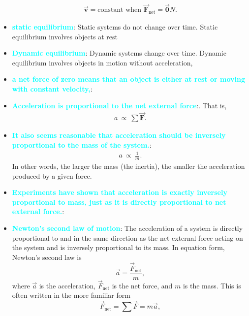 \documentclass{report}
\begin{document}
\begin{itemize}
                \begin{align*}
                    \vec{\mathbf{v}} = \text{constant when } \vec{\mathbf{F}}_{\text{net}} = \vec{\mathbf{0}}N
                .\end{align*}
            \item \textbf{\textcolor{cyan}{static equilibrium}}: Static systems do not change over time. Static equilibrium involves objects at rest
            \item \textbf{\textcolor{cyan}{Dynamic equilibrium}}: Dynamic systems change over time. Dynamic equilibrium involves objects in motion without acceleration,
            \item \textbf{\textcolor{cyan}{a net force of zero means that an object is either at rest or moving with constant velocity,}}:
            \item \textbf{\textcolor{cyan}{Acceleration is proportional to the net external force}}:. That is,
                \begin{align*}
                    a\ \propto\ \sum \vec{\mathbf{F}}
                .\end{align*}
            \item \textbf{\textcolor{cyan}{It also seems reasonable that acceleration should be inversely proportional to the mass of the system.}}:
                \begin{align*}
                    a\ \propto\ \frac{1}{m}
                .\end{align*}
                In other words, the larger the mass (the inertia), the smaller the acceleration produced by a given force.
            \item \textbf{\textcolor{cyan}{Experiments have shown that acceleration is exactly inversely proportional to mass, just as it is directly proportional to net external force.}}:
            \item \textbf{\textcolor{cyan}{Newton's second law of motion}}:
                The acceleration of a system is directly proportional to and in the same direction as the net external force acting on the system and is inversely proportional to its mass. In equation form, Newton's second law is
                \[
                    \vec{a} = \frac{\vec{F}_{\text{net}}}{m},
                \]
                where $\vec{a}$ is the acceleration, $\vec{F}_{\text{net}}$ is the net force, and $m$ is the mass. This is often written in the more familiar form
                \[
                    \vec{F}_{\text{net}} = \sum \vec{F} = m\vec{a},
                \]

\end{itemize}
\end{document}
